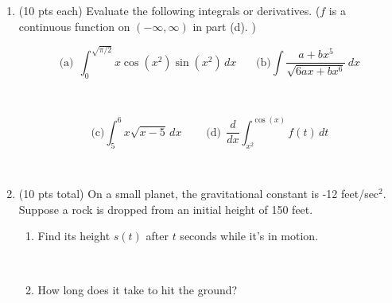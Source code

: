 \documentclass[12pt, oneside]{article}   	%
\begin{document}
\begin{enumerate}
\

\item (10 pts each) Evaluate the following integrals or derivatives. ($f$ is a continuous function on $(-\infty,\infty)$ in part (d). )

$$ \textrm{(a)} \ \ \int_0^{\sqrt{\pi/2}} x \cos(x^2)\sin(x^2) \, dx \ \ \ \ \ \ \  \ \textrm{(b)} \int \dfrac{a+bx^5}{\sqrt{6ax+bx^6} } \, dx$$

\

$$\textrm{(c)} \int_5^6 x \sqrt{x-5} \, dx \ \ \ \ \ \ \ \ \ \  \textrm{(d)} \ \  \dfrac{d}{dx} \int_{x^2}^{\cos(x)} f(t) \, dt $$


\

\item (10 pts total) On a small planet, the gravitational constant is -12 feet/sec$^2$. Suppose a rock is dropped from an initial height of 150 feet. 

\begin{enumerate}
\item Find its height $s(t)$ after $t$ seconds while it's in motion.

\

\item How long does it take to hit the ground?
\end{enumerate}





\end{enumerate}
\end{document}
